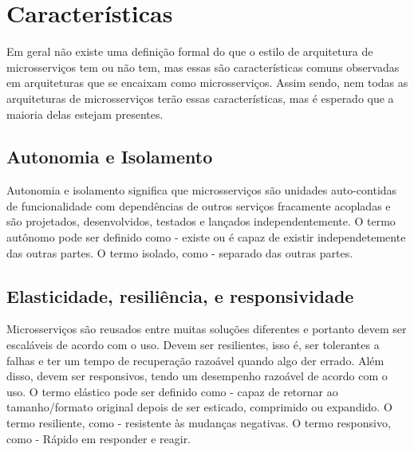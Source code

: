 \chapter{Características}\label{chapter-caracteristicas}



Em geral não existe uma definição formal do que o estilo de arquitetura de microsserviços tem ou não tem, mas essas são características comuns observadas em arquiteturas que se encaixam como microsserviços. Assim sendo, nem todas as arquiteturas de microsserviços terão essas características, mas é esperado que a maioria delas estejam presentes. \cite{MartinFowlerMicroservices}

\section{Autonomia e Isolamento}
Autonomia e isolamento significa que microsserviços são unidades auto-contidas de funcionalidade com dependências de outros serviços fracamente acopladas e são projetados, desenvolvidos, testados e lançados independentemente. O termo autônomo pode ser definido como - existe ou é capaz de existir independetemente das outras partes. O termo isolado, como - separado das outras partes. \cite{Familiar2015}

\section{Elasticidade, resiliência, e responsividade}

Microsserviços são reusados entre muitas soluções diferentes e portanto devem ser escaláveis de acordo com o uso. Devem ser resilientes, isso é, ser tolerantes a falhas e ter um tempo de recuperação razoável quando algo der errado. Além disso, devem ser responsivos, tendo um desempenho razoável de acordo com o uso. O termo elástico pode ser definido como - capaz de retornar ao tamanho/formato original depois de ser esticado, comprimido ou expandido. O termo resiliente, como - resistente às mudanças negativas. O termo responsivo, como - Rápido em responder e reagir. \cite{Familiar2015}

